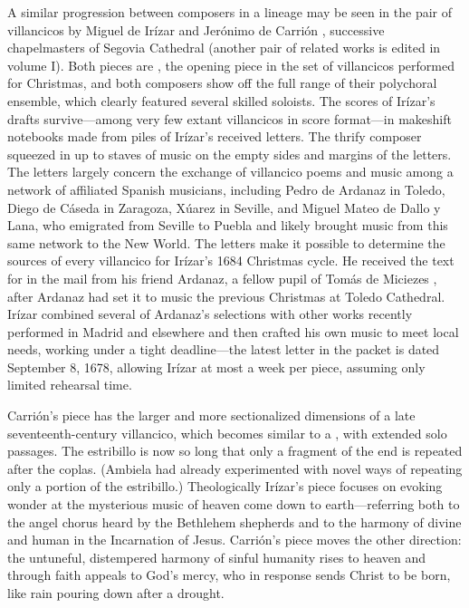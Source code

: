 A similar progression between composers in a lineage may be seen in the pair
of villancicos by Miguel de Irízar and Jerónimo de Carrión \XXX[dates],
successive chapelmasters of Segovia Cathedral (another pair of related works
is edited in volume I).
Both pieces are , the opening piece in the set of
villancicos performed for Christmas, and both composers show off the full
range of their polychoral ensemble, which clearly featured several skilled
soloists.
The scores of Irízar's drafts survive---among very few extant villancicos in
score format---in makeshift notebooks made from piles of Irízar's received
letters.
The thrify composer squeezed in up to \XXX[eleven] staves of music on the
empty sides and margins of the letters.
The letters largely concern the exchange of villancico poems and music among a
network of affiliated Spanish musicians, including Pedro de Ardanaz in Toledo,
Diego de Cáseda in Zaragoza, \XXX[Miguel] Xúarez in Seville, and Miguel Mateo
de Dallo y Lana, who emigrated from Seville to Puebla and likely brought music
from this same network to the New World.
The letters make it possible to determine the sources of every villancico for
Irízar's 1684 Christmas cycle.
He received the text for  in the mail from his
friend Ardanaz, a fellow pupil of Tomás de Miciezes \XXX[Sr?], after Ardanaz
had set it to music the previous Christmas at Toledo Cathedral.
Irízar combined several of Ardanaz's selections with other works recently
performed in Madrid and elsewhere and then crafted his own music to meet local
needs, working under a tight deadline---the latest letter in the packet is
dated September 8, 1678, allowing Irízar at most a week per piece, assuming
only limited rehearsal time.

Carrión's piece has the larger and more sectionalized dimensions of a late
seventeenth-century villancico, which becomes similar to a ,
with extended solo passages.
The estribillo is now so long that only a fragment of the end is repeated
after the coplas.
(Ambiela had already experimented with novel ways of repeating only a portion
of the estribillo.)
Theologically Irízar's piece focuses on evoking wonder at the mysterious music
of heaven come down to earth---referring both to the angel chorus heard by the
Bethlehem shepherds and to the harmony of divine and human in the Incarnation
of Jesus.
Carrión's piece moves the other direction: the untuneful, distempered harmony
of sinful humanity rises to heaven and through faith appeals to God's mercy,
who in response sends Christ to be born, like rain pouring down after a
drought.

